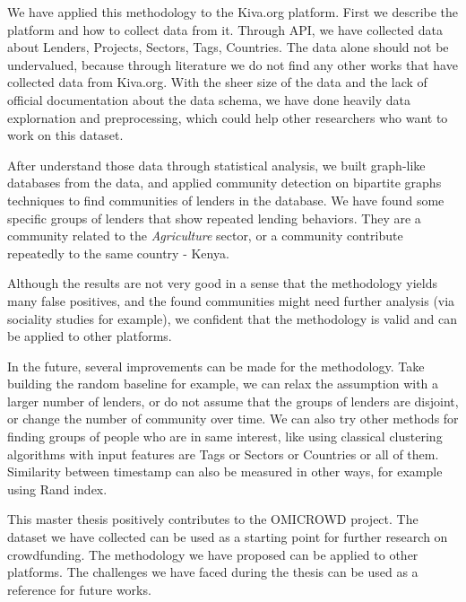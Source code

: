 We have applied this methodology to the Kiva.org platform.
First we describe the platform and how to collect data from it.
Through API, we have collected data about Lenders, Projects, Sectors, Tags, Countries.
The data alone should not be undervalued,
because through literature we do not find any other works that have collected data from Kiva.org.
With the sheer size of the data and the lack of official documentation about the data schema,
we have done heavily data explornation and preprocessing,
which could help other researchers who want to work on this dataset.

After understand those data through statistical analysis,
we built graph-like databases from the data,
and applied community detection on bipartite graphs techniques to find communities of lenders in the database.
We have found some specific groups of lenders that show repeated lending behaviors.
They are a community related to the \textit{Agriculture} sector,
or a community contribute repeatedly to the same country - Kenya.

Although the results are not very good in a sense that the methodology yields many false positives,
and the found communities might need further analysis (via sociality studies for example),
we confident that the methodology is valid and can be applied to other platforms.

In the future, several improvements can be made for the methodology.
Take building the random baseline for example,
we can relax the assumption with a larger number of lenders,
or do not assume that the groups of lenders are disjoint,
or change the number of community over time.
We can also try other methods for finding groups of people who are in same interest,
like using classical clustering algorithms with input features are Tags or Sectors or Countries or all of them.
Similarity between timestamp can also be measured in other ways, for example using Rand index.

This master thesis positively contributes to the OMICROWD project.
The dataset we have collected can be used as a starting point for further research on crowdfunding.
The methodology we have proposed can be applied to other platforms.
The challenges we have faced during the thesis can be used as a reference for future works.






